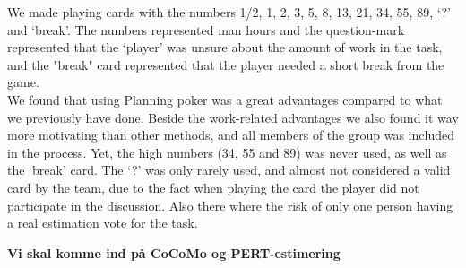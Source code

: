 We made playing cards with the numbers 1/2, 1, 2, 3, 5, 8, 13, 21, 34, 55, 89, `?' and `break'. The numbers represented man hours and the question-mark represented that the `player' was unsure about the amount of work in the task, and the "break" card represented that the player needed a short break from the game.\\
We found that using Planning poker was a great advantages compared to what we previously have done. Beside the work-related advantages we also found it way more motivating than other methods, and all members of the group was included in the process. Yet, the high numbers (34, 55 and 89) was never used, as well as the `break' card. The `?' was only rarely used, and almost not considered a valid card by the team, due to the fact when playing the card the player did not participate in the discussion. Also there where the risk of only one person having a real estimation vote for the task.

\textbf{Vi skal komme ind på CoCoMo og PERT-estimering}